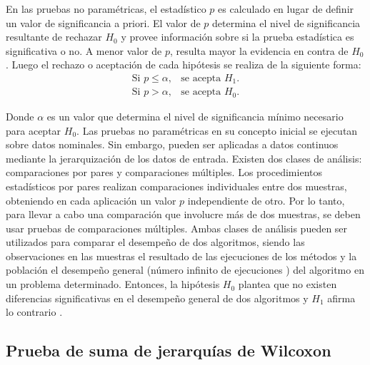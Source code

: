 En las pruebas no paramétricas, el estadístico $p$ es calculado en lugar de definir un valor de significancia a priori. El valor de $p$ determina el nivel de significancia resultante de rechazar $H_0$ y provee información sobre si la prueba estadística es significativa o no. A menor valor de $p$, resulta mayor la evidencia en contra de $H_0$. Luego el rechazo o aceptación de cada hipótesis se realiza de la siguiente forma:
\begin{eqnarray}
\text{Si } p \leq \alpha,& \text{se acepta } H_1.\\
\text{Si } p> \alpha,& \text{se acepta } H_0.
\end{eqnarray}

Donde $\alpha$ es un valor que determina el nivel de significancia mínimo necesario para aceptar $H_0$. Las pruebas no paramétricas en su concepto inicial se ejecutan sobre datos nominales. Sin embargo, pueden ser aplicadas a datos continuos mediante la jerarquización de los datos de entrada. Existen dos clases de análisis: comparaciones por pares y comparaciones múltiples. Los procedimientos estadísticos por pares realizan comparaciones individuales entre dos muestras, obteniendo en cada aplicación un valor $p$ independiente de otro. Por lo tanto, para llevar a cabo una comparación que involucre más de dos muestras, se deben usar pruebas de comparaciones múltiples. Ambas clases de análisis pueden ser utilizados para comparar el desempeño de dos algoritmos, siendo las observaciones en las muestras el resultado de las ejecuciones de los métodos y  la población el desempeño general (número infinito de ejecuciones ) del algoritmo en un problema determinado.  Entonces, la hipótesis $H_0$ plantea que no existen diferencias significativas en el desempeño general de dos algoritmos y $H_1$ afirma lo contrario   \cite{derrac2011practical}.


\subsection{Prueba de suma de jerarquías de Wilcoxon}

